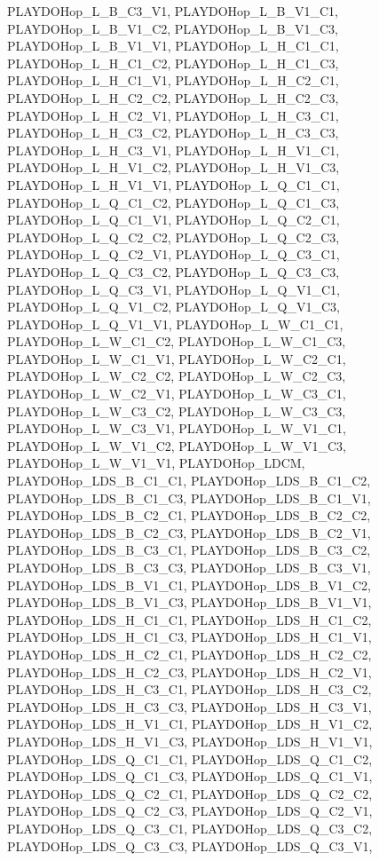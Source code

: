 PLAYDOHop\_\-L\_\-B\_\-C3\_\-V1, PLAYDOHop\_\-L\_\-B\_\-V1\_\-C1, PLAYDOHop\_\-L\_\-B\_\-V1\_\-C2, PLAYDOHop\_\-L\_\-B\_\-V1\_\-C3, PLAYDOHop\_\-L\_\-B\_\-V1\_\-V1, PLAYDOHop\_\-L\_\-H\_\-C1\_\-C1, PLAYDOHop\_\-L\_\-H\_\-C1\_\-C2, PLAYDOHop\_\-L\_\-H\_\-C1\_\-C3, PLAYDOHop\_\-L\_\-H\_\-C1\_\-V1, PLAYDOHop\_\-L\_\-H\_\-C2\_\-C1, PLAYDOHop\_\-L\_\-H\_\-C2\_\-C2, PLAYDOHop\_\-L\_\-H\_\-C2\_\-C3, PLAYDOHop\_\-L\_\-H\_\-C2\_\-V1, PLAYDOHop\_\-L\_\-H\_\-C3\_\-C1, PLAYDOHop\_\-L\_\-H\_\-C3\_\-C2, PLAYDOHop\_\-L\_\-H\_\-C3\_\-C3, PLAYDOHop\_\-L\_\-H\_\-C3\_\-V1, PLAYDOHop\_\-L\_\-H\_\-V1\_\-C1, PLAYDOHop\_\-L\_\-H\_\-V1\_\-C2, PLAYDOHop\_\-L\_\-H\_\-V1\_\-C3, PLAYDOHop\_\-L\_\-H\_\-V1\_\-V1, PLAYDOHop\_\-L\_\-Q\_\-C1\_\-C1, PLAYDOHop\_\-L\_\-Q\_\-C1\_\-C2, PLAYDOHop\_\-L\_\-Q\_\-C1\_\-C3, PLAYDOHop\_\-L\_\-Q\_\-C1\_\-V1, PLAYDOHop\_\-L\_\-Q\_\-C2\_\-C1, PLAYDOHop\_\-L\_\-Q\_\-C2\_\-C2, PLAYDOHop\_\-L\_\-Q\_\-C2\_\-C3, PLAYDOHop\_\-L\_\-Q\_\-C2\_\-V1, PLAYDOHop\_\-L\_\-Q\_\-C3\_\-C1, PLAYDOHop\_\-L\_\-Q\_\-C3\_\-C2, PLAYDOHop\_\-L\_\-Q\_\-C3\_\-C3, PLAYDOHop\_\-L\_\-Q\_\-C3\_\-V1, PLAYDOHop\_\-L\_\-Q\_\-V1\_\-C1, PLAYDOHop\_\-L\_\-Q\_\-V1\_\-C2, PLAYDOHop\_\-L\_\-Q\_\-V1\_\-C3, PLAYDOHop\_\-L\_\-Q\_\-V1\_\-V1, PLAYDOHop\_\-L\_\-W\_\-C1\_\-C1, PLAYDOHop\_\-L\_\-W\_\-C1\_\-C2, PLAYDOHop\_\-L\_\-W\_\-C1\_\-C3, PLAYDOHop\_\-L\_\-W\_\-C1\_\-V1, PLAYDOHop\_\-L\_\-W\_\-C2\_\-C1, PLAYDOHop\_\-L\_\-W\_\-C2\_\-C2, PLAYDOHop\_\-L\_\-W\_\-C2\_\-C3, PLAYDOHop\_\-L\_\-W\_\-C2\_\-V1, PLAYDOHop\_\-L\_\-W\_\-C3\_\-C1, PLAYDOHop\_\-L\_\-W\_\-C3\_\-C2, PLAYDOHop\_\-L\_\-W\_\-C3\_\-C3, PLAYDOHop\_\-L\_\-W\_\-C3\_\-V1, PLAYDOHop\_\-L\_\-W\_\-V1\_\-C1, PLAYDOHop\_\-L\_\-W\_\-V1\_\-C2, PLAYDOHop\_\-L\_\-W\_\-V1\_\-C3, PLAYDOHop\_\-L\_\-W\_\-V1\_\-V1, PLAYDOHop\_\-LDCM, PLAYDOHop\_\-LDS\_\-B\_\-C1\_\-C1, PLAYDOHop\_\-LDS\_\-B\_\-C1\_\-C2, PLAYDOHop\_\-LDS\_\-B\_\-C1\_\-C3, PLAYDOHop\_\-LDS\_\-B\_\-C1\_\-V1, PLAYDOHop\_\-LDS\_\-B\_\-C2\_\-C1, PLAYDOHop\_\-LDS\_\-B\_\-C2\_\-C2, PLAYDOHop\_\-LDS\_\-B\_\-C2\_\-C3, PLAYDOHop\_\-LDS\_\-B\_\-C2\_\-V1, PLAYDOHop\_\-LDS\_\-B\_\-C3\_\-C1, PLAYDOHop\_\-LDS\_\-B\_\-C3\_\-C2, PLAYDOHop\_\-LDS\_\-B\_\-C3\_\-C3, PLAYDOHop\_\-LDS\_\-B\_\-C3\_\-V1, PLAYDOHop\_\-LDS\_\-B\_\-V1\_\-C1, PLAYDOHop\_\-LDS\_\-B\_\-V1\_\-C2, PLAYDOHop\_\-LDS\_\-B\_\-V1\_\-C3, PLAYDOHop\_\-LDS\_\-B\_\-V1\_\-V1, PLAYDOHop\_\-LDS\_\-H\_\-C1\_\-C1, PLAYDOHop\_\-LDS\_\-H\_\-C1\_\-C2, PLAYDOHop\_\-LDS\_\-H\_\-C1\_\-C3, PLAYDOHop\_\-LDS\_\-H\_\-C1\_\-V1, PLAYDOHop\_\-LDS\_\-H\_\-C2\_\-C1, PLAYDOHop\_\-LDS\_\-H\_\-C2\_\-C2, PLAYDOHop\_\-LDS\_\-H\_\-C2\_\-C3, PLAYDOHop\_\-LDS\_\-H\_\-C2\_\-V1, PLAYDOHop\_\-LDS\_\-H\_\-C3\_\-C1, PLAYDOHop\_\-LDS\_\-H\_\-C3\_\-C2, PLAYDOHop\_\-LDS\_\-H\_\-C3\_\-C3, PLAYDOHop\_\-LDS\_\-H\_\-C3\_\-V1, PLAYDOHop\_\-LDS\_\-H\_\-V1\_\-C1, PLAYDOHop\_\-LDS\_\-H\_\-V1\_\-C2, PLAYDOHop\_\-LDS\_\-H\_\-V1\_\-C3, PLAYDOHop\_\-LDS\_\-H\_\-V1\_\-V1, PLAYDOHop\_\-LDS\_\-Q\_\-C1\_\-C1, PLAYDOHop\_\-LDS\_\-Q\_\-C1\_\-C2, PLAYDOHop\_\-LDS\_\-Q\_\-C1\_\-C3, PLAYDOHop\_\-LDS\_\-Q\_\-C1\_\-V1, PLAYDOHop\_\-LDS\_\-Q\_\-C2\_\-C1, PLAYDOHop\_\-LDS\_\-Q\_\-C2\_\-C2, PLAYDOHop\_\-LDS\_\-Q\_\-C2\_\-C3, PLAYDOHop\_\-LDS\_\-Q\_\-C2\_\-V1, PLAYDOHop\_\-LDS\_\-Q\_\-C3\_\-C1, PLAYDOHop\_\-LDS\_\-Q\_\-C3\_\-C2, PLAYDOHop\_\-LDS\_\-Q\_\-C3\_\-C3, PLAYDOHop\_\-LDS\_\-Q\_\-C3\_\-V1, 